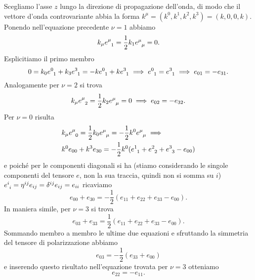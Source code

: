 Scegliamo l'asse $z$ lungo la direzione di propagazione dell'onda, di modo che
il vettore d'onda controvariante abbia la forma
$k^{\mu} = (k^{0}, k^{1}, k^{2}, k^{3}) = (k, 0, 0, k)$.  Ponendo nell'equazione
precedente $\nu = 1$ abbiamo
\begin{equation}
  k_{\mu}\tensor{e}{^{\mu}_{1}} = \frac{1}{2} k_{1}\tensor{e}{^{\mu}_{\mu}} = 0.
\end{equation}
Esplicitiamo il primo membro
\begin{equation}
  0 = k_{0} \tensor{e}{^{0}_{1}} + k_{3} \tensor{e}{^{3}_{1}} = -k
  \tensor{e}{^{0}_{1}} + k \tensor{e}{^{3}_{1}} \implies
  \tensor{e}{^{0}_{1}} = \tensor{e}{^{3}_{1}} \implies e_{01} = -e_{31}.
\end{equation}
Analogamente per $\nu = 2$ si trova
\begin{equation}
  k_{\mu} \tensor{e}{^{\mu}_{2}} = \frac{1}{2} k_{2} \tensor{e}{^{\mu}_{\mu}} =
  0 \implies e_{02} = -e_{32}.
\end{equation}
Per $\nu = 0$ risulta
\begin{equation}
  \begin{split}
    &k_{\mu} \tensor{e}{^{\mu}_{0}} = \frac{1}{2} k_{0}\tensor{e}{^{\mu}_{\mu}}
    = -\frac{1}{2}k^{0}\tensor{e}{^{\mu}_{\mu}} \implies \\
    &k^{0} e_{00} + k^{3}e_{30} = -\frac{1}{2}k^{0}(\tensor{e}{^{1}_{1}} +
    \tensor{e}{^{2}_{2}} + \tensor{e}{^{3}_{3}} - e_{00})
  \end{split}
\end{equation}
e poiché per le componenti diagonali si ha (stiamo considerando le singole
componenti del tensore $e$, non la sua traccia, quindi non si somma su $i$)
$\tensor{e}{^{i}_{i}} = \eta^{ij}e_{ij} = \delta^{ij}e_{ij} = e_{ii}$ ricaviamo
\begin{equation}
  e_{00} + e_{30} = -\frac{1}{2}(e_{11} + e_{22} + e_{33} - e_{00}).
\end{equation}
In maniera simile, per $\nu = 3$ si trova
\begin{equation}
  e_{03} + e_{33} = \frac{1}{2}(e_{11} + e_{22} + e_{33} - e_{00}).
\end{equation}
Sommando membro a membro le ultime due equazioni e sfruttando la simmetria del
tensore di polarizzazione abbiamo
\begin{equation}
  e_{03} = -\frac{1}{2}(e_{33} + e_{00})
\end{equation}
e inserendo questo risultato nell'equazione trovata per $\nu = 3$ otteniamo
\begin{equation}
  e_{22} = -e_{11}.
\end{equation}
